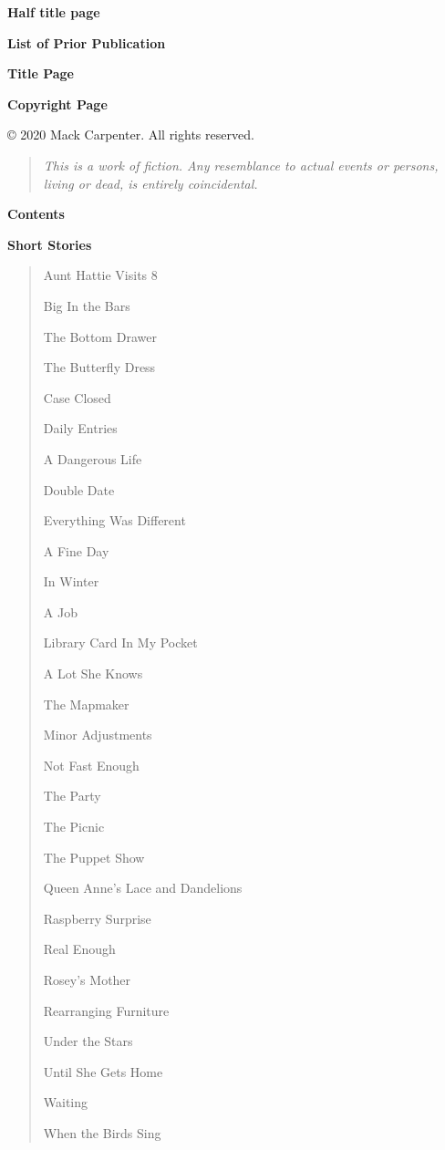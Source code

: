 \documentclass[
]{article}
\author{}
\date{}
\begin{document}
\textbf{Half title page}

\textbf{\hfill\break
}

\textbf{List of Prior Publication\\
}

\textbf{Title Page\\
}

\textbf{Copyright Page}

© 2020 Mack Carpenter. All rights reserved.

\begin{quote}
\emph{This is a work of fiction. Any resemblance to actual events or
persons, living or dead, is entirely coincidental.}
\end{quote}

\textbf{\hfill\break
}

\textbf{\hfill\break
}

\textbf{\hfill\break
}

\textbf{Contents}

\textbf{Short Stories}

\begin{quote}
Aunt Hattie Visits 8

Big In the Bars

The Bottom Drawer

The Butterfly Dress

Case Closed

Daily Entries

A Dangerous Life

Double Date

Everything Was Different

A Fine Day

In Winter

A Job

Library Card In My Pocket

A Lot She Knows

The Mapmaker

Minor Adjustments

Not Fast Enough

The Party

The Picnic

The Puppet Show

Queen Anne's Lace and Dandelions

Raspberry Surprise

Real Enough

Rosey's Mother

Rearranging Furniture

Under the Stars

Until She Gets Home

Waiting

When the Birds Sing
\end{quote}
\end{document}
